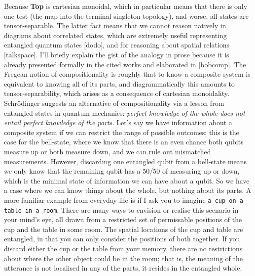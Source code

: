 \begin{fullwidth}
 Because \textbf{Top} is cartesian monoidal, which in particular means that there is only one test (the map into the terminal singleton topology), and worse, all states are tensor-separable. The latter fact means that we cannot reason natively in diagrams about correlated states, which are extremely useful representing entangled quantum states [dodo], and for reasoning about spatial relations [talkspace]. I'll briefly explain the gist of the analogy in prose because it is already presented formally in the cited works and elaborated in [bobcomp]. The Fregean notion of compositionality is roughly that to know a composite system is equivalent to knowing all of its parts, and diagrammatically this amounts to tensor-separability, which arises as a consequence of cartesian monoidality. Schr\"{o}dinger suggests an alternative of compositionality via a lesson from entangled states in quantum mechanics: \emph{perfect knowledge of the whole does not entail perfect knowledge of the parts.} Let's say we have information about a composite system if we can restrict the range of possible outcomes; this is the case for the bell-state, where we know that there is an even chance both qubits measure up or both measure down, and we can rule out mismatched measurements. However, discarding one entangled qubit from a bell-state means we only know that the remaining qubit has a 50/50 of measuring up or down, which is the minimal state of information we can have about a qubit. So we have a case where we can know things about the whole, but nothing about its parts. A more familiar example from everyday life is if I ask you to imagine \texttt{a cup on a table in a room}. There are many ways to envision or realise this scenario in your mind's eye, all drawn from a restricted set of permissable positions of the cup and the table in some room. The spatial locations of the cup and table are entangled, in that you can only consider the positions of both together. If you discard either the cup or the table from your memory, there are no restrictions about where the other object could be in the room; that is, the meaning of the utterance is not localised in any of the parts, it resides in the entangled whole.

\end{fullwidth}